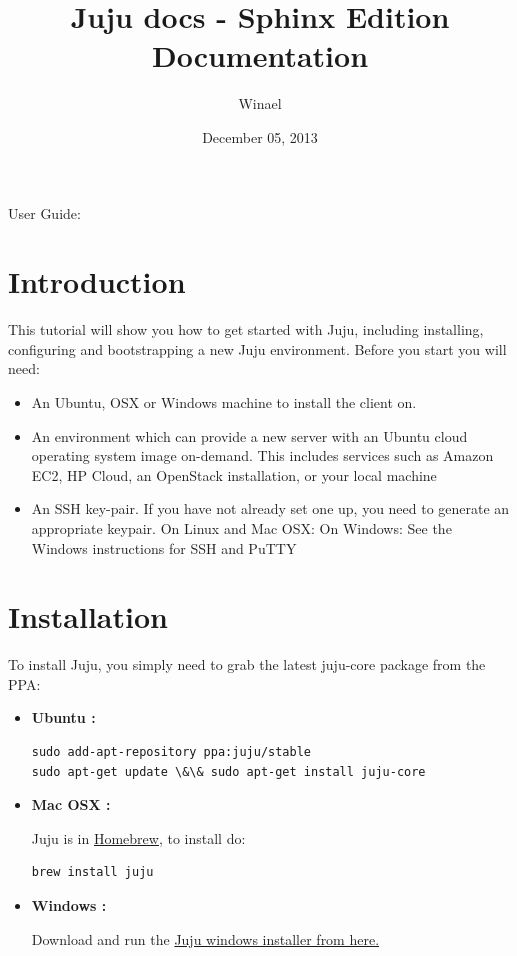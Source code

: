\documentclass[letterpaper,10pt,english]{sphinxmanual}
\title{Juju docs - Sphinx Edition Documentation}
\date{December 05, 2013}
\author{Winael}
\begin{document}
\maketitle
\tableofcontents
{}\label{index::doc}


User Guide:


\chapter{Introduction}
\label{getting-started:introduction}\label{getting-started::doc}\label{getting-started:welcome-to-juju-docs-sphinx-edition-s-documentation}
This tutorial will show you how to get started with Juju, including
installing, configuring and bootstrapping a new Juju environment.
Before you start you will need:
\begin{itemize}
\item {} 
An Ubuntu, OSX or Windows machine to install the client on.

\item {} 
An environment which can provide a new server with an Ubuntu cloud
operating system image on-demand. This includes services such as
Amazon EC2, HP Cloud, an OpenStack installation, or your local machine

\item {} 
An SSH key-pair. If you have not already set one up, you need to
generate an appropriate keypair. On Linux and Mac OSX:  On Windows: See the Windows instructions for SSH and
PuTTY

\end{itemize}


\chapter{Installation}
\label{getting-started:installation}
To install Juju, you simply need to grab the latest juju-core package
from the PPA:
\begin{itemize}
\item {} 
\textbf{Ubuntu :}

\begin{Verbatim}[commandchars=\\\{\}]
sudo add-apt-repository ppa:juju/stable
sudo apt-get update \&\& sudo apt-get install juju-core
\end{Verbatim}

\item {} 
\textbf{Mac OSX :}

Juju is in \href{http://brew.sh/}{Homebrew}, to install do:

\begin{Verbatim}[commandchars=\\\{\}]
brew install juju
\end{Verbatim}

\item {} 
\textbf{Windows :}

Download and run the \href{https://launchpad.net/juju-core/1.16/1.16.2/+download/juju-setup-1.16.2-signed.exe}{Juju windows installer from here.}

\end{itemize}
\end{document}
